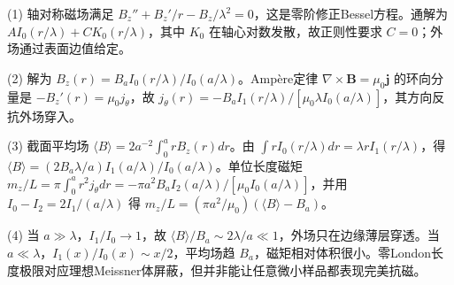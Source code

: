 (1) 轴对称磁场满足 \(B_z''+B_z'/r-B_z/\lambda^2=0\)，这是零阶修正Bessel方程。通解为 \(A I_0(r/\lambda)+C K_0(r/\lambda)\)，其中 \(K_0\) 在轴心对数发散，故正则性要求 \(C=0\)；外场通过表面边值给定。

(2) 解为 \(\boxed{B_z(r)=B_a I_0(r/\lambda)/I_0(a/\lambda)}\)。Ampère定律 \(\nabla\times\mathbf B=\mu_0\mathbf j\) 的环向分量是 \(-B_z'(r)=\mu_0j_\theta\)，故 \(\boxed{j_\theta(r)=-B_aI_1(r/\lambda)/[\mu_0\lambda I_0(a/\lambda)]}\)，其方向反抗外场穿入。

(3) 截面平均场 \(\langle B\rangle=2a^{-2}\int_0^a rB_z(r)dr\)。由 \(\int rI_0(r/\lambda)dr=\lambda rI_1(r/\lambda)\)，得 \(\boxed{\langle B\rangle=(2B_a\lambda/a)I_1(a/\lambda)/I_0(a/\lambda)}\)。单位长度磁矩 \(m_z/L=\pi\int_0^a r^2j_\theta dr=-\pi a^2B_aI_2(a/\lambda)/[\mu_0I_0(a/\lambda)]\)，并用 \(I_0-I_2=2I_1/(a/\lambda)\) 得 \(m_z/L=(\pi a^2/\mu_0)(\langle B\rangle-B_a)\)。

(4) 当 \(a\gg\lambda\)，\(I_1/I_0\to1\)，故 \(\langle B\rangle/B_a\sim2\lambda/a\ll1\)，外场只在边缘薄层穿透。当 \(a\ll\lambda\)，\(I_1(x)/I_0(x)\sim x/2\)，平均场趋 \(B_a\)，磁矩相对体积很小。零London长度极限对应理想Meissner体屏蔽，但并非能让任意微小样品都表现完美抗磁。
